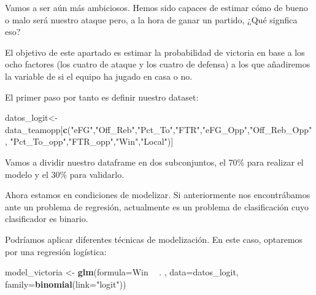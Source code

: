 \documentclass[
]{article}
\newenvironment{Shaded}{\begin{snugshade}}{\end{snugshade}}
\newcommand{\DataTypeTok}[1]{\textcolor[rgb]{0.13,0.29,0.53}{#1}}
\newcommand{\DecValTok}[1]{\textcolor[rgb]{0.00,0.00,0.81}{#1}}
\newcommand{\FloatTok}[1]{\textcolor[rgb]{0.00,0.00,0.81}{#1}}
\newcommand{\KeywordTok}[1]{\textcolor[rgb]{0.13,0.29,0.53}{\textbf{#1}}}
\newcommand{\NormalTok}[1]{#1}
\newcommand{\OperatorTok}[1]{\textcolor[rgb]{0.81,0.36,0.00}{\textbf{#1}}}
\newcommand{\OtherTok}[1]{\textcolor[rgb]{0.56,0.35,0.01}{#1}}
\newcommand{\StringTok}[1]{\textcolor[rgb]{0.31,0.60,0.02}{#1}}
\begin{document}
Vamos a ser aún más ambiciosos. Hemos sido capaces de estimar cómo de
bueno o malo será nuestro ataque pero, a la hora de ganar un partido,
¿Qué signfica eso?

El objetivo de este apartado es estimar la probabilidad de victoria en
base a los ocho factores (los cuatro de ataque y los cuatro de defensa)
a los que añadiremos la variable de si el equipo ha jugado en casa o no.

El primer paso por tanto es definir nuestro dataset:

\begin{Shaded}
\begin{Highlighting}[]
\NormalTok{datos_logit<-data_teamopp[}\KeywordTok{c}\NormalTok{(}\StringTok{"eFG"}\NormalTok{,}\StringTok{"Off_Reb"}\NormalTok{,}\StringTok{"Pct_To"}\NormalTok{,}\StringTok{"FTR"}\NormalTok{,}\StringTok{"eFG_Opp"}\NormalTok{,}\StringTok{"Off_Reb_Opp"}\NormalTok{,}
                            \StringTok{"Pct_To_opp"}\NormalTok{,}\StringTok{"FTR_opp"}\NormalTok{,}\StringTok{"Win"}\NormalTok{,}\StringTok{"Local"}\NormalTok{)]}
\end{Highlighting}
\end{Shaded}

Vamos a dividir nuestro dataframe en dos subconjuntos, el 70\% para
realizar el modelo y el 30\% para validarlo.

\begin{Shaded}
\end{Shaded}

Ahora estamos en condiciones de modelizar. Si anteriormente nos
encontrábamos ante un problema de regresión, actualmente es un problema
de clasificación cuyo clasificador es binario.

Podríamos aplicar diferentes técnicas de modelización. En este caso,
optaremos por una regresión logística:

\begin{Shaded}
\begin{Highlighting}[]
\NormalTok{model_victoria <-}\StringTok{ }\KeywordTok{glm}\NormalTok{(}\DataTypeTok{formula=}\NormalTok{Win }\OperatorTok{~}\StringTok{ }\NormalTok{. , }\DataTypeTok{data=}\NormalTok{datos_logit, }\DataTypeTok{family=}\KeywordTok{binomial}\NormalTok{(}\DataTypeTok{link=}\StringTok{"logit"}\NormalTok{))}
\end{Highlighting}
\end{Shaded}
\end{document}
